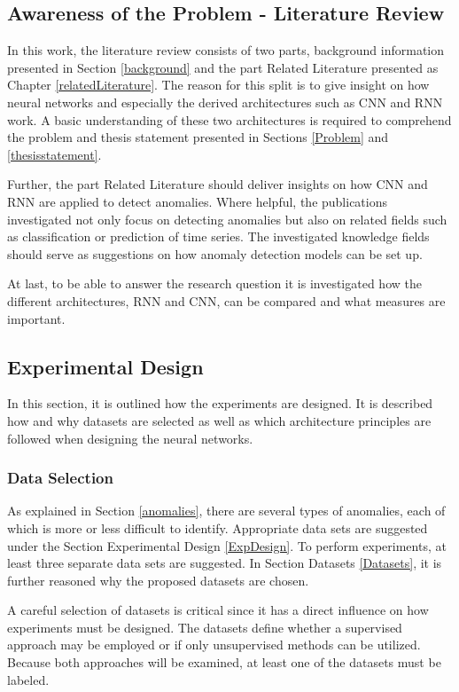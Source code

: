 \newpage
\subsection{Awareness of the Problem - Literature Review}
In this work, the literature review consists of two parts, background information presented in Section \ref{background} and the part Related Literature presented as Chapter \ref{relatedLiterature}. The reason for this split is to give insight on how neural networks and especially the derived architectures such as CNN and RNN work. A basic understanding of these two architectures is required to comprehend the problem and thesis statement presented in Sections \ref{Problem} and \ref{thesisstatement}. 

Further, the part Related Literature should deliver insights on how CNN and RNN are applied to detect anomalies. Where helpful, the publications investigated not only focus on detecting anomalies but also on related fields such as classification or prediction of time series. The investigated knowledge fields should serve as suggestions on how anomaly detection models can be set up. 

At last, to be able to answer the research question it is investigated how the different architectures, RNN and CNN, can be compared and what measures are important. 

\subsection{Experimental Design}
In this section, it is outlined how the experiments are designed. It is described how and why datasets are selected as well as which architecture principles are followed when designing the neural networks.

\subsubsection{Data Selection}
As explained in Section \ref{anomalies}, there are several types of anomalies, each of which is more or less difficult to identify. Appropriate data sets are suggested under the Section Experimental Design \ref{ExpDesign}. To perform experiments, at least three separate data sets are suggested. In Section Datasets \ref{Datasets}, it is further reasoned why the proposed datasets are chosen.
 
A careful selection of datasets is critical since it has a direct influence on how experiments must be designed. The datasets define whether a supervised approach may be employed or if only unsupervised methods can be utilized. Because both approaches will be examined, at least one of the datasets must be labeled. 

